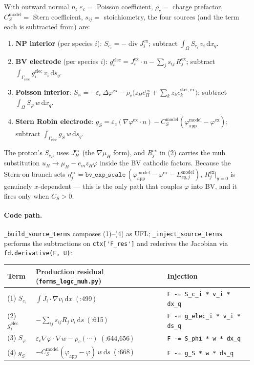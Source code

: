 \documentclass[11pt]{article}
\DeclareMathOperator{\divg}{div}
\newcommand{\elec}{\mathrm{elec}}
\newcommand{\ster}{\mathrm{ster}}
\newcommand{\app}{\mathrm{app}}
\newcommand{\modl}{\mathrm{model}}
\newcommand{\ex}{\mathrm{ex}}
\begin{document}
\medskip\noindent
With outward normal $n$, $\varepsilon_c=$ Poisson coefficient,
$\rho_c=$ charge prefactor, $C_S^\modl=$ Stern coefficient, $s_{ij}=$
stoichiometry, the four sources (and the term each is subtracted from) are:
\begin{enumerate}\setlength{\itemsep}{3pt}
  \item \textbf{NP interior} (per species $i$):
    $S_{c_i} = -\divg J_i^\ex$;\quad
    subtract $\int_\Omega S_{c_i}\,v_i\,\mathrm{d}x_q$.
  \item \textbf{BV electrode} (per species $i$):
    $g_i^\elec = J_i^\ex\!\cdot n - \sum_j s_{ij}\,R_j^\ex$;\quad
    subtract $\int_{\Gamma_\elec} g_i^\elec\,v_i\,\mathrm{d}s_q$.
  \item \textbf{Poisson interior}:
    $S_\varphi = -\varepsilon_c\,\Delta\varphi^\ex
      - \rho_c\bigl(z_H c_H^\ex + \sum_k z_k c_k^{\ster,\ex}\bigr)$;\quad
    subtract $\int_\Omega S_\varphi\,w\,\mathrm{d}x_q$.
  \item \textbf{Stern Robin electrode}:
    $g_S = \varepsilon_c(\nabla\varphi^\ex\!\cdot n)
      - C_S^\modl(\varphi_\app^\modl - \varphi^\ex)$;\quad
    subtract $\int_{\Gamma_\elec} g_S\,w\,\mathrm{d}s_q$.
\end{enumerate}
The proton's $S_{c_H}$ uses $J_H^\ex$ (the $\nabla\mu_H$ form), and
$R_j^\ex$ in (2) carries the muh substitution
$u_H\!\to\!\mu_H - e_m z_H\varphi$ inside the BV cathodic factors. Because
the Stern-on branch sets $\eta_j^\ex = \texttt{bv\_exp\_scale}\,(
\varphi_\app^\modl - \varphi^\ex - E_{eq,j}^\modl)$, $R_j^\ex|_{y=0}$ is
genuinely $x$-dependent --- this is the only path that couples $\varphi$
into BV, and it fires only when $C_S>0$.

\paragraph{Code path.}
\verb|_build_source_terms| composes (1)--(4) as UFL; \verb|_inject_source_terms|
performs the subtractions on \verb|ctx['F_res']| and rederives the Jacobian via
\verb|fd.derivative(F, U)|:

\begin{center}
\small
\begin{tabular}{lll}
\toprule
Term & Production residual (\verb|forms_logc_muh.py|) & Injection \\
\midrule
(1) $S_{c_i}$ & $\int J_i\!\cdot\!\nabla v_i\,\mathrm{d}x$ \,(\,:499\,) &
  \verb|F -= S_c_i * v_i * dx_q| \\
(2) $g_i^\elec$ & $-\sum_{ij} s_{ij}R_j\,v_i\,\mathrm{d}s$ \,(\,:615\,) &
  \verb|F -= g_elec_i * v_i * ds_q| \\
(3) $S_\varphi$ & $\varepsilon_c\nabla\varphi\!\cdot\!\nabla w - \rho_c(\cdots)$ \,(\,:644,656\,) &
  \verb|F -= S_phi * w * dx_q| \\
(4) $g_S$ & $-C_S^\modl(\varphi_\app-\varphi)\,w\,\mathrm{d}s$ \,(\,:668\,) &
  \verb|F -= g_S * w * ds_q| \\
\bottomrule
\end{tabular}
\end{center}
\end{document}
